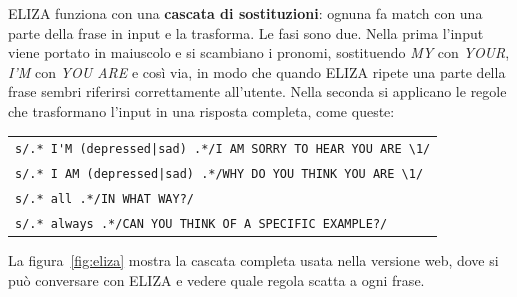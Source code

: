 ELIZA funziona con una \textbf{cascata di sostituzioni}: ognuna fa match con una parte della frase in input e la trasforma. Le fasi sono due. Nella prima l'input viene portato in maiuscolo e si scambiano i pronomi, sostituendo \textit{MY} con \textit{YOUR}, \textit{I'M} con \textit{YOU ARE} e così via, in modo che quando ELIZA ripete una parte della frase sembri riferirsi correttamente all'utente. Nella seconda si applicano le regole che trasformano l'input in una risposta completa, come queste:
\begin{center}
\begin{tabular}{l}
\verb+s/.* I'M (depressed|sad) .*/I AM SORRY TO HEAR YOU ARE \1/+ \\
\verb+s/.* I AM (depressed|sad) .*/WHY DO YOU THINK YOU ARE \1/+ \\
\verb|s/.* all .*/IN WHAT WAY?/| \\
\verb|s/.* always .*/CAN YOU THINK OF A SPECIFIC EXAMPLE?/| \\
\end{tabular}
\end{center}
La figura~\ref{fig:eliza} mostra la cascata completa usata nella versione web, dove si può conversare con ELIZA e vedere quale regola scatta a ogni frase.

